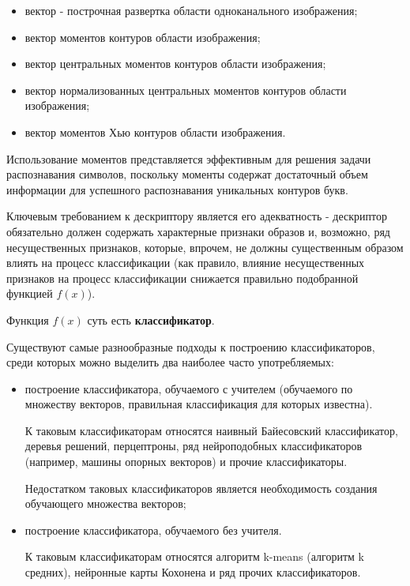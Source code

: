 \begin{enumerate}
	\begin{itemize}

		\item вектор - построчная развертка области одноканального изображения;
		\item вектор моментов контуров области изображения;
		\item вектор центральных моментов контуров области изображения;
		\item вектор нормализованных центральных моментов контуров области изображения;
		\item вектор моментов Хью контуров области изображения.

	\end{itemize}

	Использование моментов представляется эффективным для решения задачи распознавания символов, поскольку моменты содержат достаточный объем информации для успешного распознавания уникальных контуров букв.

	Ключевым требованием к дескриптору является его адекватность - дескриптор обязательно должен содержать характерные признаки образов и, возможно, ряд несущественных признаков, которые, впрочем, не должны существенным образом влиять на процесс классификации (как правило, влияние несущественных признаков на процесс классификации снижается правильно подобранной функцией $f(x)$).

	Функция $f(x)$ суть есть {\bf классификатор}.

	Существуют самые разнообразные подходы к построению классификаторов, среди которых можно выделить два наиболее часто употребляемых:

	\begin{itemize}

		\item построение классификатора, обучаемого с учителем (обучаемого по множеству векторов, правильная классификация для которых известна).

		К таковым классификаторам относятся наивный Байесовский классификатор, деревья решений, перцептроны, ряд нейроподобных классификаторов (например, машины опорных векторов) и прочие классификаторы.

		Недостатком таковых классификаторов является необходимость создания обучающего множества векторов;

		\item построение классификатора, обучаемого без учителя.

		К таковым классификаторам относятся алгоритм k-means (алгоритм k средних), нейронные карты Кохонена и ряд прочих классификаторов.


\end{itemize}
\end{enumerate}
